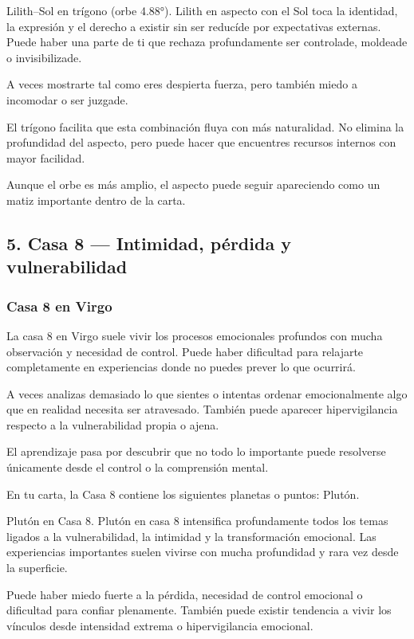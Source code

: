 \documentclass[11pt,a4paper]{article}
\begin{document}
Lilith–Sol en trígono (orbe 4.88°).
Lilith en aspecto con el Sol toca la identidad, la expresión y el derecho a existir sin ser reducíde por expectativas externas. Puede haber una parte de ti que rechaza profundamente ser controlade, moldeade o invisibilizade.

A veces mostrarte tal como eres despierta fuerza, pero también miedo a incomodar o ser juzgade.

El trígono facilita que esta combinación fluya con más naturalidad. No elimina la profundidad del aspecto, pero puede hacer que encuentres recursos internos con mayor facilidad.

Aunque el orbe es más amplio, el aspecto puede seguir apareciendo como un matiz importante dentro de la carta.

\vspace{0.8cm}

\subsection{5. Casa 8 — Intimidad, pérdida y vulnerabilidad}

\subsubsection*{Casa 8 en Virgo}

La casa 8 en Virgo suele vivir los procesos emocionales profundos con mucha observación y necesidad de control. Puede haber dificultad para relajarte completamente en experiencias donde no puedes prever lo que ocurrirá.

A veces analizas demasiado lo que sientes o intentas ordenar emocionalmente algo que en realidad necesita ser atravesado. También puede aparecer hipervigilancia respecto a la vulnerabilidad propia o ajena.

El aprendizaje pasa por descubrir que no todo lo importante puede resolverse únicamente desde el control o la comprensión mental.

En tu carta, la Casa 8 contiene los siguientes planetas o puntos: Plutón.

Plutón en Casa 8.
Plutón en casa 8 intensifica profundamente todos los temas ligados a la vulnerabilidad, la intimidad y la transformación emocional. Las experiencias importantes suelen vivirse con mucha profundidad y rara vez desde la superficie.

Puede haber miedo fuerte a la pérdida, necesidad de control emocional o dificultad para confiar plenamente. También puede existir tendencia a vivir los vínculos desde intensidad extrema o hipervigilancia emocional.
\end{document}
